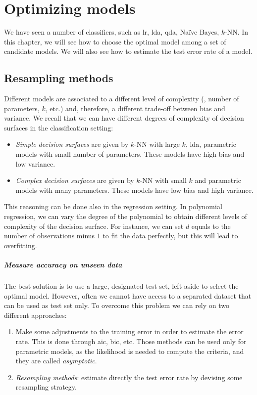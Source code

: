 \chapter{Optimizing models}

We have seen a number of classifiers, such as \acs{lr}, \acs{lda}, \acs{qda}, Na\"ive Bayes, $k$-NN. In this chapter, we will see how to choose the optimal model among a set of candidate models. We will also see how to estimate the test error rate of a model.

\section{Resampling methods}
Different models are associated to a different level of complexity (\eg, number of parameters, $k$, etc.) and, therefore, a different trade-off between bias and variance. We recall that we can have different degrees of complexity of decision surfaces in the classification setting:
\begin{itemize}
    \item \emph{Simple decision surfaces} are given by $k$-NN with large $k$, \acs{lda}, parametric models with small number of parameters. These models have high bias and low variance.
    \item \emph{Complex decision surfaces} are given by $k$-NN with small $k$ and parametric models with many parameters. These models have low bias and high variance.
\end{itemize}
This reasoning can be done also in the regression setting. In polynomial regression, we can vary the degree of the polynomial to obtain different levels of complexity of the decision surface. For instance, we can set $d$ equals to the number of observations minus $1$ to fit the data perfectly, but this will lead to overfitting.

\paragraph{Measure accuracy on unseen data}

The best solution is to use a large, designated test set, left aside to select the optimal model. However, often we cannot have access to a separated dataset that can be used as test set only. To overcome this problem we can rely on two different approaches:
\begin{enumerate}
    \item Make some adjustments to the training error in order to estimate the error rate. This is done through \acf{aic}, \acf{bic}, etc. Those methods can be used only for parametric models, as the likelihood is needed to compute the criteria, and they are called \emph{asymptotic}.
    \item \emph{Resampling methods}: estimate directly the test error rate by devising some resampling strategy.
\end{enumerate}

